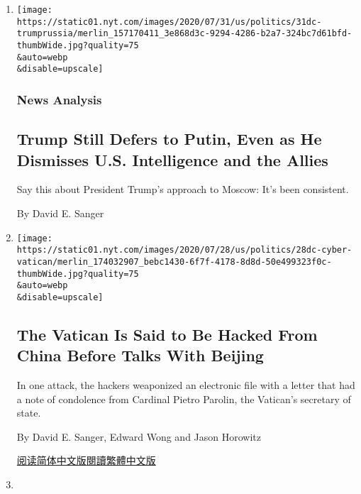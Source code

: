 \begin{enumerate}
\def\labelenumi{\arabic{enumi}.}
\item
  \href{/2020/07/31/us/politics/trump-russia-nato-bounties.html}{}

  \texttt{[image: https://static01.nyt.com/images/2020/07/31/us/politics/31dc-trumprussia/merlin\_157170411\_3e868d3c-9294-4286-b2a7-324bc7d61bfd-thumbWide.jpg?quality=75\\\&auto=webp\\\&disable=upscale]}

  \hypertarget{news-analysis}{%
  \subsubsection{News Analysis}\label{news-analysis}}

  \hypertarget{trump-still-defers-to-putin-even-as-he-dismisses-us-intelligence-and-the-allies}{%
  \subsection{Trump Still Defers to Putin, Even as He Dismisses U.S.
  Intelligence and the
  Allies}\label{trump-still-defers-to-putin-even-as-he-dismisses-us-intelligence-and-the-allies}}

  Say this about President Trump's approach to Moscow: It's been
  consistent.

  By David E. Sanger
\item
  \href{/2020/07/28/us/politics/china-vatican-hack.html}{}

  \texttt{[image: https://static01.nyt.com/images/2020/07/28/us/politics/28dc-cyber-vatican/merlin\_174032907\_bebc1430-6f7f-4178-8d8d-50e499323f0c-thumbWide.jpg?quality=75\\\&auto=webp\\\&disable=upscale]}

  \hypertarget{the-vatican-is-said-to-be-hacked-from-china-before-talks-with-beijing}{%
  \subsection{The Vatican Is Said to Be Hacked From China Before Talks
  With
  Beijing}\label{the-vatican-is-said-to-be-hacked-from-china-before-talks-with-beijing}}

  In one attack, the hackers weaponized an electronic file with a letter
  that had a note of condolence from Cardinal Pietro Parolin, the
  Vatican's secretary of state.

  By David E. Sanger, Edward Wong and Jason Horowitz

  \href{https://cn.nytimes.com/world/20200729/china-vatican-hack/}{阅读简体中文版}\href{https://cn.nytimes.com/world/20200729/china-vatican-hack/zh-hant/}{閱讀繁體中文版}
\item
  \href{/2020/07/28/us/politics/russia-disinformation-coronavirus.html}{}


\end{enumerate}
